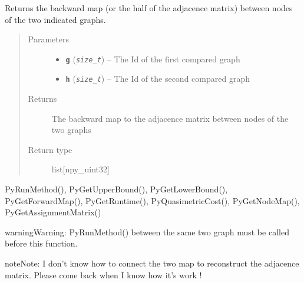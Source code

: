 \documentclass[letterpaper,10pt,english]{sphinxmanual}
\begin{document}
\begin{fulllineitems}
\label{doc:PythonGedLib.PyGetBackwardMap}
Returns the backward map (or the half of the adjacence matrix) between nodes of the two indicated graphs.
\begin{quote}\begin{description}
\item[{Parameters}] \leavevmode\begin{itemize}
\item {} 
\textbf{\texttt{g}} (\emph{\texttt{size\_t}}) -- The Id of the first compared graph

\item {} 
\textbf{\texttt{h}} (\emph{\texttt{size\_t}}) -- The Id of the second compared graph

\end{itemize}

\item[{Returns}] \leavevmode
The backward map to the adjacence matrix between nodes of the two graphs

\item[{Return type}] \leavevmode
list{[}npy\_uint32{]}

\end{description}\end{quote}




PyRunMethod(), PyGetUpperBound(), PyGetLowerBound(), PyGetForwardMap(), PyGetRuntime(), PyQuasimetricCost(), PyGetNodeMap(), PyGetAssignmentMatrix()



\begin{notice}{warning}{Warning:}
PyRunMethod() between the same two graph must be called before this function.
\end{notice}

\begin{notice}{note}{Note:}
I don't know how to connect the two map to reconstruct the adjacence matrix. Please come back when I know how it's work !
\end{notice}

\end{fulllineitems}

\end{document}
